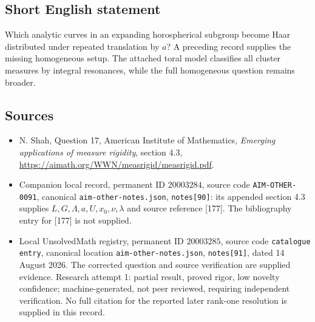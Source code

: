 \documentclass[11pt]{article}
\begin{document}
\subsection{Short English statement}
Which analytic curves in an expanding horospherical subgroup become Haar distributed under repeated translation by $a$? A preceding record supplies the missing homogeneous setup. The attached toral model classifies all cluster measures by integral resonances, while the full homogeneous question remains broader.
\subsection{Sources}
\begin{itemize}
\item N. Shah, Question 17, American Institute of Mathematics, \emph{Emerging applications of measure rigidity}, section 4.3, \url{https://aimath.org/WWN/measrigid/measrigid.pdf}.
\item Companion local record, permanent ID $20003284$, source code \texttt{AIM-OTHER-0091}, canonical \texttt{aim-other-notes.json}, \texttt{notes[90]}: its appended section 4.3 supplies $L,G,\Lambda,a,U,x_0,\nu,\lambda$ and source reference [177]. The bibliography entry for [177] is not supplied.
\item Local UnsolvedMath registry, permanent ID $20003285$, source code \texttt{catalogue entry}, canonical location \texttt{aim-other-notes.json}, \texttt{notes[91]}, dated 14 August 2026. The corrected question and source verification are supplied evidence. Research attempt 1: partial result, proved rigor, low novelty confidence; machine-generated, not peer reviewed, requiring independent verification. No full citation for the reported later rank-one resolution is supplied in this record.
\end{itemize}
\end{document}
